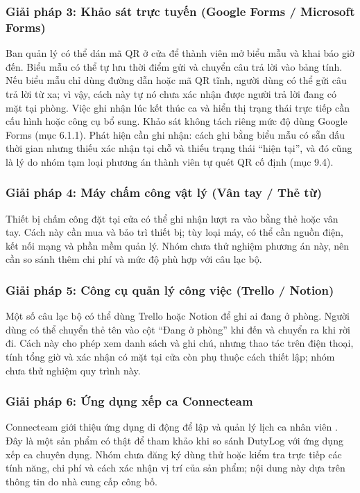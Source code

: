 \subsubsection{Giải pháp 3: Khảo sát trực tuyến (Google Forms / Microsoft Forms)}
Ban quản lý có thể dán mã QR ở cửa để thành viên mở biểu mẫu và khai báo giờ đến. Biểu mẫu có thể tự lưu thời điểm gửi và chuyển câu trả lời vào bảng tính. Nếu biểu mẫu chỉ dùng đường dẫn hoặc mã QR tĩnh, người dùng có thể gửi câu trả lời từ xa; vì vậy, cách này tự nó chưa xác nhận được người trả lời đang có mặt tại phòng. Việc ghi nhận lúc kết thúc ca và hiển thị trạng thái trực tiếp cần cấu hình hoặc công cụ bổ sung. Khảo sát không tách riêng mức độ dùng Google Forms (mục 6.1.1). Phát hiện cần ghi nhận: cách ghi bằng biểu mẫu có sẵn dấu thời gian nhưng thiếu xác nhận tại chỗ và thiếu trạng thái ``hiện tại'', và đó cũng là lý do nhóm tạm loại phương án thành viên tự quét QR cố định (mục 9.4).
\subsubsection{Giải pháp 4: Máy chấm công vật lý (Vân tay / Thẻ từ)}
Thiết bị chấm công đặt tại cửa có thể ghi nhận lượt ra vào bằng thẻ hoặc vân tay. Cách này cần mua và bảo trì thiết bị; tùy loại máy, có thể cần nguồn điện, kết nối mạng và phần mềm quản lý. Nhóm chưa thử nghiệm phương án này, nên cần so sánh thêm chi phí và mức độ phù hợp với câu lạc bộ.

\subsubsection{Giải pháp 5: Công cụ quản lý công việc (Trello / Notion)}
Một số câu lạc bộ có thể dùng Trello hoặc Notion để ghi ai đang ở phòng. Người dùng có thể chuyển thẻ tên vào cột “Đang ở phòng” khi đến và chuyển ra khi rời đi. Cách này cho phép xem danh sách và ghi chú, nhưng thao tác trên điện thoại, tính tổng giờ và xác nhận có mặt tại cửa còn phụ thuộc cách thiết lập; nhóm chưa thử nghiệm quy trình này.

\subsubsection{Giải pháp 6: Ứng dụng xếp ca Connecteam}
Connecteam giới thiệu ứng dụng di động để lập và quản lý lịch ca nhân viên \cite{p4_connecteam}. Đây là một sản phẩm có thật để tham khảo khi so sánh DutyLog với ứng dụng xếp ca chuyên dụng. Nhóm chưa đăng ký dùng thử hoặc kiểm tra trực tiếp các tính năng, chi phí và cách xác nhận vị trí của sản phẩm; nội dung này dựa trên thông tin do nhà cung cấp công bố.

